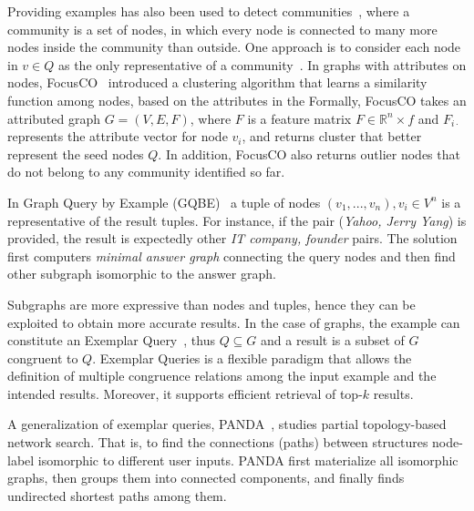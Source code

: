 Providing examples has also been used to detect communities~\citep{staudt2014detecting,perozzi2014focused}, where a community is a set of nodes, in which every node is connected to many more nodes inside the community than outside. 
One approach is to consider each node in $v \in Q$ as the only representative of a community~\citep{staudt2014detecting}. 
In graphs with attributes on nodes, FocusCO~\citep{perozzi2014focused} introduced a clustering algorithm that learns a similarity function among nodes, based on the attributes in the 
Formally, FocusCO takes an attributed graph $G = (V,E,F)$, where $F$ is a feature matrix $F \in \mathbb{R}^n\times f$ and $F_{i\cdot}$ represents the attribute vector for node $v_i$, and returns cluster that better represent the seed nodes $Q$.
In addition, FocusCO also returns outlier nodes that do not belong to any community identified so far.  



In Graph Query by Example (GQBE)~\citep{jayaram2015querying} a tuple of nodes $(v_1, ..., v_n), v_i \in V^n$ is a representative of the result tuples. 
For instance, if the pair (\emph{Yahoo, Jerry Yang}) is provided, the result is expectedly other \emph{IT company, founder} pairs. 
The solution first computers \emph{minimal answer graph} connecting the query nodes and then find other subgraph isomorphic to the answer graph. 

Subgraphs are more expressive than nodes and tuples, hence they can be exploited to obtain more accurate results. 
In the case of graphs, the example can constitute an Exemplar Query~\citep{mottin2016exemplar}, thus $Q\subseteq G$ and a result is a subset of $G$ congruent to $Q$.
Exemplar Queries is a flexible paradigm that allows the definition of multiple congruence relations among the input example and the intended results. 
Moreover, it supports efficient retrieval of top-$k$ results. 

A generalization of exemplar queries, PANDA~\citep{xie2017panda}, studies partial topology-based network search. 
That is, to find the connections (paths) between structures node-label isomorphic to different user inputs. 
PANDA first materialize all isomorphic graphs, then groups them into connected components, and finally finds undirected shortest paths among them. 

